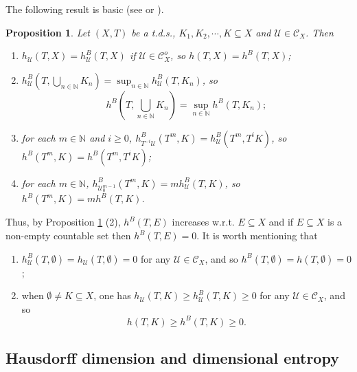 \documentclass[12pt]{amsart}
\newtheorem{prop}[thm]{Proposition}
\theoremstyle{definition} \theoremstyle{question}
\numberwithin{equation}{section}
\begin{document}
The following result is basic (see \cite[Propositions 1 and 2]{B3}
or \cite[Proposition 2.3]{HYZ1}).

\begin{prop} \label{06.02.28}
Let $(X, T)$ be a t.d.s., $K_1, K_2, \cdots, K\subseteq X$
and $\mathcal{U}\in \mathcal{C}_X$. Then
\begin{enumerate}

\item $h_\mathcal{U} (T, X)= h^B_\mathcal{U} (T, X)$ if $\mathcal{U}
\in \mathcal{C}_X^o$, so $h (T, X)= h^B (T, X)$;

\item $h^B_\mathcal{U} (T, \bigcup_{n\in \mathbb{N}}
K_n)= \sup_{n\in \mathbb{N}} h^B_\mathcal{U} (T, K_n)$, so
$$h^B (T,
\bigcup_{n\in \mathbb{N}} K_n)= \sup_{n\in \mathbb{N}} h^B (T,
K_n);$$

\item for each $m\in \mathbb{N}$ and $i\ge 0$,
$h^B_{T^{-i}\mathcal{U}} (T^m, K)= h^B_\mathcal{U} (T^m, T^iK)$,
so $h^B (T^m, K)= h^B (T^m, T^i K)$;

\item for each $m\in
\mathbb{N}$, $h^B_{\mathcal{U}_0^{m- 1}} (T^m, K)= m h^B_\mathcal{U}
(T, K)$, so $h^B (T^m, K)= m h^B (T, K)$.
\end{enumerate}
\end{prop}

Thus, by Proposition \ref{06.02.28} (2), $h^B (T, E)$ increases
w.r.t.
 $E\subseteq X$ and
if $E\subseteq X$ is a non-empty countable set then $h^B (T, E)=0$.
It is worth mentioning that
\begin{enumerate}

\item
$h_{\mathcal{U}}^B(T,\emptyset)=h_{\mathcal{U}}(T,\emptyset)=0$ for
any  $\mathcal{U}\in \mathcal{C}_X$, and so
$h^B(T,\emptyset)=h(T,\emptyset)=0$;

\item when $\emptyset \neq
K\subseteq X$, one has $h_{\mathcal{U}}(T,K)\ge
h_{\mathcal{U}}^B(T,K)\ge 0$ for any $\mathcal{U}\in \mathcal{C}_X$,
and so
$$h(T,K)\ge h^B(T,K)\ge 0.$$
\end{enumerate}

\subsection{Hausdorff dimension and dimensional entropy}
\end{document}
